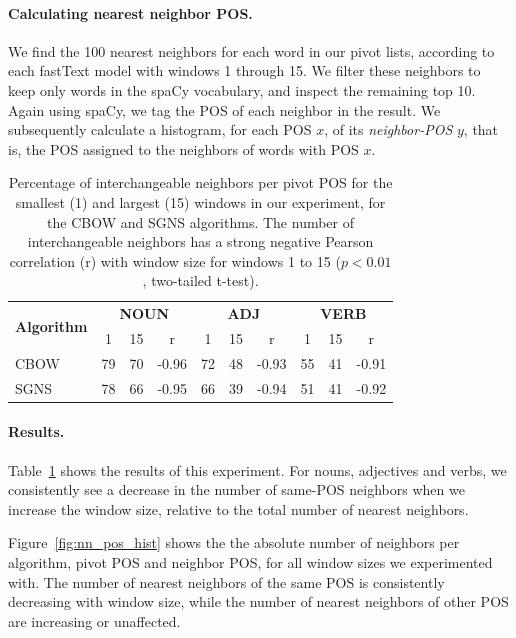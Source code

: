 \documentclass[11pt,a4paper]{article}
\begin{document}
    \paragraph{Calculating nearest neighbor POS.}
    
    We find the 100 nearest neighbors for each word in our pivot lists,
    according to each fastText model with windows 1 through 15.
    We filter these neighbors to
    keep only words in the spaCy vocabulary, and inspect the remaining top 10.
    Again using spaCy, we tag the POS of each neighbor in the result.
    We subsequently calculate a histogram, for each POS $x$, of its
    \textit{neighbor-POS} $y$, that is, the POS assigned to the neighbors of
    words with POS $x$.
    
    \begin{table}[t]
    \centering
    \small
    \setlength\tabcolsep{3.5pt}
    \def\arraystretch{1.125}
    \begin{tabular}{l|ccc|ccc|ccc}
    \multirow{2}{1cm}{\bf Algorithm}
    & \multicolumn{3}{c|}{\bf NOUN} & \multicolumn{3}{c|}{\bf ADJ} & \multicolumn{3}{c}{\bf VERB} \\
    & 1 & 15 & r & 1 & 15 & r & 1 & 15 & r \\
    \hline
    CBOW & 79 & 70 & -0.96 & 72 & 48 & -0.93 & 55 & 41 & -0.91 \\
    SGNS & 78 & 66 & -0.95 & 66 & 39 & -0.94 & 51 & 41 & -0.92 
    \end{tabular}
    \caption{Percentage of interchangeable neighbors per pivot POS for the smallest (1) and largest (15)
        windows in our experiment, for the CBOW and SGNS algorithms.
        The number of interchangeable neighbors has a strong negative Pearson correlation (r) with window size
        for windows 1 to 15 ($p<0.01$, two-tailed t-test).
    \label{tab:nn_pos_hist}}
    \end{table}
    
    \paragraph{Results.}
    
    Table~\ref{tab:nn_pos_hist} shows the results of this experiment.
    For nouns, adjectives and verbs, we consistently see a decrease in
    the  number of same-POS neighbors when we increase the window size,
    relative to the total number of nearest
    neighbors.
    
    
    Figure~\ref{fig:nn_pos_hist} shows the the absolute number of neighbors per algorithm,
    pivot POS and neighbor POS, for all window sizes we experimented with.
    The number of nearest neighbors of the same POS is consistently decreasing with window size,
    while the number of nearest neighbors of other POS are increasing or unaffected.
    
\end{document}
